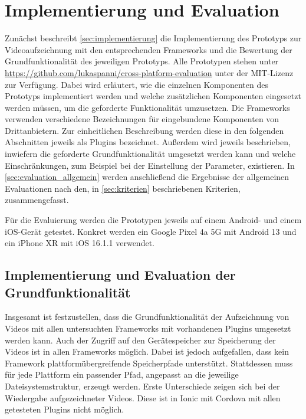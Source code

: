 \chapter{Implementierung und Evaluation}
\label{ch:evaluation}

Zunächst beschreibt \autoref{sec:implementierung} die Implementierung des Prototyps zur Videoaufzeichnung mit den entsprechenden Frameworks und die Bewertung der Grundfunktionalität des jeweiligen Prototyps.
Alle Prototypen stehen unter \url{https://github.com/lukaspanni/cross-platform-evaluation} unter der MIT-Lizenz zur Verfügung.
Dabei wird erläutert, wie die einzelnen Komponenten des Prototyps implementiert werden und welche zusätzlichen Komponenten eingesetzt werden müssen, um die geforderte Funktionalität umzusetzen.
Die Frameworks verwenden verschiedene Bezeichnungen für eingebundene Komponenten von Drittanbietern.
Zur einheitlichen Beschreibung werden diese in den folgenden Abschnitten jeweils als Plugins bezeichnet.
Außerdem wird jeweils beschrieben, inwiefern die geforderte Grundfunktionalität umgesetzt werden kann und welche Einschränkungen, zum Beispiel bei der Einstellung der Parameter, existieren.
In \autoref{sec:evaluation_allgemein} werden anschließend die Ergebnisse der allgemeinen Evaluationen nach den, in \autoref{sec:kriterien} beschriebenen Kriterien, zusammengefasst.

Für die Evaluierung werden die Prototypen jeweils auf einem Android- und einem iOS-Gerät getestet.
Konkret werden ein Google Pixel 4a 5G mit Android 13 und ein iPhone XR mit iOS 16.1.1 verwendet. 

\section{Implementierung und Evaluation der Grundfunktionalität}
\label{sec:implementierung}

Insgesamt ist festzustellen, dass die Grundfunktionalität der Aufzeichnung von Videos mit allen untersuchten Frameworks mit vorhandenen Plugins umgesetzt werden kann.
Auch der Zugriff auf den Gerätespeicher zur Speicherung der Videos ist in allen Frameworks möglich.
Dabei ist jedoch aufgefallen, dass kein Framework plattformübergreifende Speicherpfade unterstützt.
Stattdessen muss für jede Plattform ein passender Pfad, angepasst an die jeweilige Dateisystemstruktur, erzeugt werden.
Erste Unterschiede zeigen sich bei der Wiedergabe aufgezeichneter Videos.
Diese ist in Ionic mit Cordova mit allen getesteten Plugins nicht möglich.

